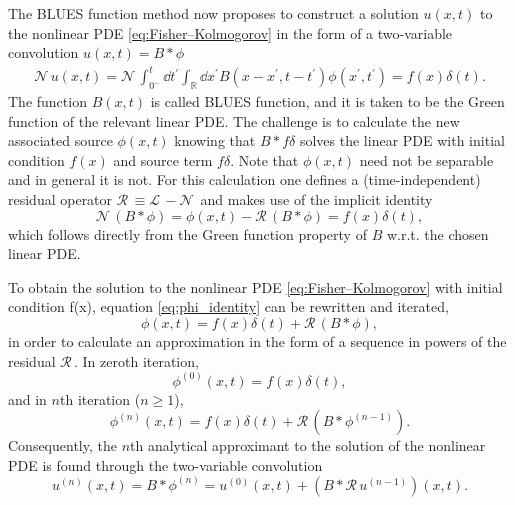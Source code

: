 \documentclass[amsmath,amssymb,amsfonts,aps,pre,preprint,superscriptaddress,bibnotes,showpacs,showkeys,longbibliography]{revtex4-1}
\newcommand*{\lop}{\mathcal{L}\,}
\newcommand*{\nlop}{\mathcal{N}\,}
\newcommand*{\rop}{\mathcal{R}\,}
\begin{document}
The BLUES function method now proposes to construct a solution $u(x, t)$ to the nonlinear PDE \eqref{eq:Fisher–Kolmogorov} in the form of a two-variable convolution $u(x, t) = B * \phi$
\begin{align}
    \label{eq:rewriten_nonlinear_operator_delta_u}
	\nlop u(x, t)=\nlop\int_{0^{-}}^{t} \dd{t^{\prime}} \int_{\mathbb{R}} \dd{x^{\prime}} B\left(x-x^{\prime}, t-t^{\prime}\right) \phi\left(x^{\prime}, t^{\prime}\right)=f(x) \delta(t).
\end{align}
The function $B(x, t)$ is called BLUES function, and it is taken to be the Green function of the relevant linear PDE. The challenge is to calculate the new associated source $\phi(x,t)$ knowing that $B \ast f \delta$ solves the linear PDE with initial condition $f(x)$ and source term $f \delta$. Note that $\phi(x,t)$ need not be separable and in general it is not. For this calculation one defines a (time-independent) residual operator $\rop \equiv \lop - \nlop$ and makes use of the implicit identity
\begin{equation}
    \label{eq:phi_identity}
    \nlop (B\ast\phi) = \phi(x,t) - \rop (B\ast\phi) = f(x)\delta(t), 
\end{equation}
which follows directly from the Green function property of $B$ w.r.t. the chosen linear PDE.

To obtain the solution to the nonlinear PDE \eqref{eq:Fisher–Kolmogorov} with initial condition f(x), equation \eqref{eq:phi_identity} can be rewritten and iterated,
\begin{equation}
    \label{eq:phi_identity_re}
  \phi(x,t)  = f(x)\delta(t) +  \rop (B\ast\phi), 
\end{equation}
 in order to calculate an approximation in the form of a sequence in powers of the residual $\rop$. In zeroth iteration, 
\begin{equation}
    \label{eq:zeroth_order}
    \phi^{(0)}(x,t) = f(x) \delta (t),
\end{equation}
and in $n$th iteration ($n\geq1$), 
\begin{equation}
    \label{eq:nth_order}
    \phi^{(n)}(x,t) = f(x) \delta (t) + \rop (B \ast \phi^{(n-1)}).
\end{equation}
Consequently, the $n$th analytical approximant to the solution of the nonlinear PDE is found through the two-variable convolution
\begin{equation}
    \label{eq:nth_order_u}
    u^{(n)}(x,t) = B \ast \phi^{(n)} = u^{(0)}(x,t) + (B\ast \rop u^{(n-1)})(x,t).
\end{equation}
\end{document}
